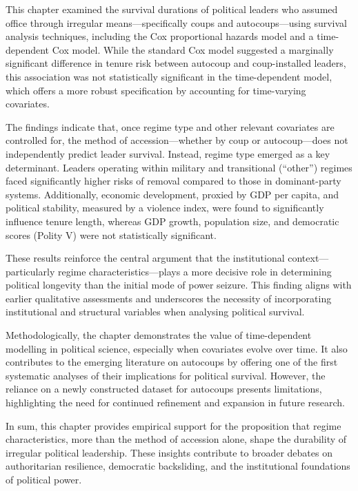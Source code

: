 \documentclass[
  12pt,
]{report}
\begin{document}
This chapter examined the survival durations of political leaders who
assumed office through irregular means---specifically coups and
autocoups---using survival analysis techniques, including the Cox
proportional hazards model and a time-dependent Cox model. While the
standard Cox model suggested a marginally significant difference in
tenure risk between autocoup and coup-installed leaders, this
association was not statistically significant in the time-dependent
model, which offers a more robust specification by accounting for
time-varying covariates.

The findings indicate that, once regime type and other relevant
covariates are controlled for, the method of accession---whether by coup
or autocoup---does not independently predict leader survival. Instead,
regime type emerged as a key determinant. Leaders operating within
military and transitional (``other'') regimes faced significantly higher
risks of removal compared to those in dominant-party systems.
Additionally, economic development, proxied by GDP per capita, and
political stability, measured by a violence index, were found to
significantly influence tenure length, whereas GDP growth, population
size, and democratic scores (Polity V) were not statistically
significant.

These results reinforce the central argument that the institutional
context---particularly regime characteristics---plays a more decisive
role in determining political longevity than the initial mode of power
seizure. This finding aligns with earlier qualitative assessments and
underscores the necessity of incorporating institutional and structural
variables when analysing political survival.

Methodologically, the chapter demonstrates the value of time-dependent
modelling in political science, especially when covariates evolve over
time. It also contributes to the emerging literature on autocoups by
offering one of the first systematic analyses of their implications for
political survival. However, the reliance on a newly constructed dataset
for autocoups presents limitations, highlighting the need for continued
refinement and expansion in future research.

In sum, this chapter provides empirical support for the proposition that
regime characteristics, more than the method of accession alone, shape
the durability of irregular political leadership. These insights
contribute to broader debates on authoritarian resilience, democratic
backsliding, and the institutional foundations of political power.
\end{document}
